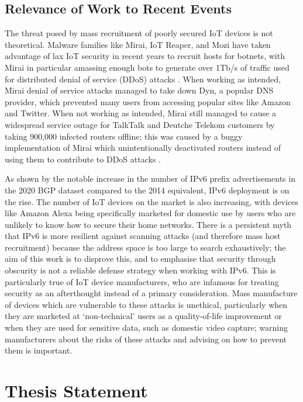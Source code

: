\documentclass[10pt,sigconf]{acmart}
\begin{document}
\subsection{Relevance of Work to Recent Events}
The threat posed by mass recruitment of poorly secured IoT devices is not theoretical.
Malware families like Mirai, IoT Reaper, and Mozi have taken advantage of lax IoT security in recent years to recruit hosts for botnets, with Mirai in particular amassing enough bots to generate over 1Tb/s of traffic used for distributed denial of service (DDoS) attacks \cite{mirai-traffic}.
When working as intended, Mirai denial of service attacks managed to take down Dyn, a popular DNS provider, which prevented many users from accessing popular sites like Amazon and Twitter.
When not working as intended, Mirai still managed to cause a widespread service outage for TalkTalk and Deutche Telekom customers by taking 900,000 infected routers offline;
this was caused by a buggy implementation of Mirai which unintentionally deactivated routers instead of using them to contribute to DDoS attacks \cite{antonakakis2017}.

As shown by the notable increase in the number of IPv6 prefix advertisements in the 2020 BGP dataset compared to the 2014 equivalent, IPv6 deployment is on the rise.
The number of IoT devices on the market is also increasing, with devices like Amazon Alexa being specifically marketed for domestic use by users who are unlikely to know how to secure their home networks.
There is a persistent myth that IPv6 is more resilient against scanning attacks (and therefore mass host recruitment) because the address space is too large to search exhaustively;
the aim of this work is to disprove this, and to emphasise that security through obscurity is not a reliable defense strategy when working with IPv6.
This is particularly true of IoT device manufacturers, who are infamous for treating security as an afterthought instead of a primary consideration.
Mass manufacture of devices which are vulnerable to these attacks is unethical, particularly when they are marketed at `non-technical' users as a quality-of-life improvement or when they are used for sensitive data, such as domestic video capture;
warning manufacturers about the risks of these attacks and advising on how to prevent them is important.

\section{Thesis Statement}
\end{document}
